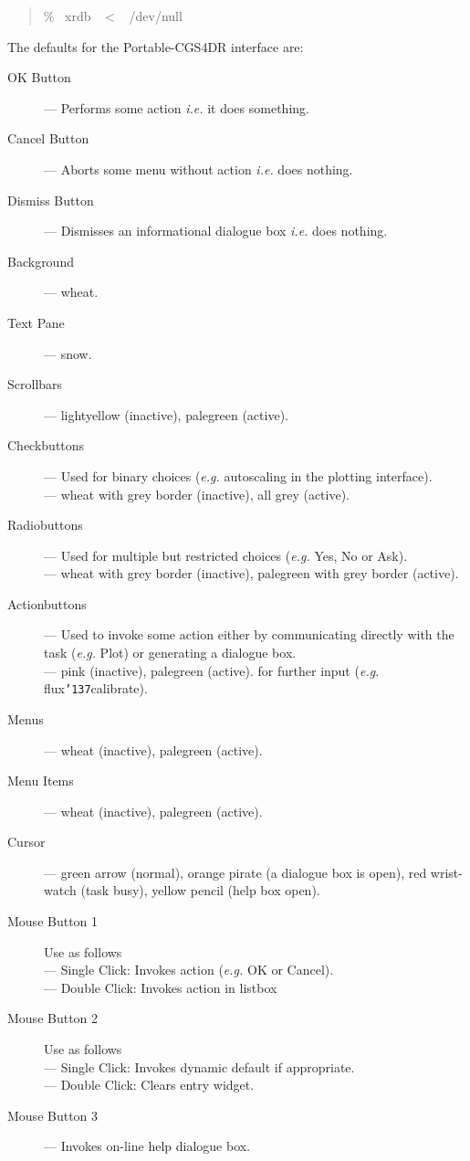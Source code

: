 \documentclass[a4paper]{book}
\renewcommand{\_}{{\tt\char'137}}
\begin{document}
\begin{quote}
 \% \ xrdb \ $<$ \ /dev/null
\end{quote}

The defaults for the Portable-CGS4DR interface are:
\begin{description}
\item[{\sf OK Button}] --- Performs some action {\em i.e.} it does something.
\item[{\sf Cancel Button}] --- Aborts some menu without action {\em i.e.} does nothing.
\item[{\sf Dismiss Button}] --- Dismisses an informational dialogue box {\em i.e.} does nothing.
\item[{\sf Background}] --- wheat.
\item[{\sf Text Pane}] --- snow.
\item[{\sf Scrollbars}] --- lightyellow (inactive), palegreen (active). 
\item[{\sf Checkbuttons}] --- Used for binary choices ({\em e.g.} autoscaling in the plotting interface). \\
 --- wheat with grey border (inactive), all grey (active). 
\item[{\sf Radiobuttons}] --- Used for multiple but restricted choices 
({\em e.g.} {\sf Yes}, {\sf No} or {\sf Ask}). \\
 --- wheat with grey border (inactive), palegreen with grey border (active).
\item[{\sf Actionbuttons}] --- Used to invoke some action
  either by communicating directly with the task ({\em e.g.} Plot) or 
  generating a dialogue box. \\
  --- pink (inactive), palegreen (active). 
for further input ({\em e.g.} flux\_calibrate).
\item[{\sf Menus}] --- wheat (inactive), palegreen (active).
\item[{\sf Menu Items}] --- wheat (inactive), palegreen (active). 
\item[{\sf Cursor}] --- green arrow (normal), orange pirate (a dialogue box is open), red wrist-watch (task busy), yellow pencil (help box open).
\item[{\sf Mouse Button 1}] Use as follows \\
  --- Single Click: Invokes action ({\em e.g.} OK or Cancel). \\
  --- Double Click: Invokes action in listbox
\item[{\sf Mouse Button 2}] Use as follows \\
  --- Single Click: Invokes dynamic default if appropriate. \\
  --- Double Click: Clears entry widget.
\item[{\sf Mouse Button 3}] --- Invokes on-line help dialogue box.
\end{description}
\end{document}
